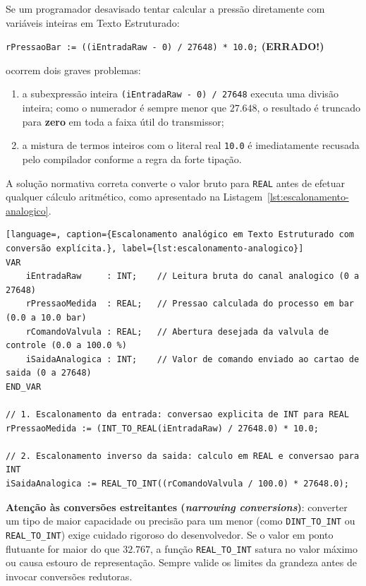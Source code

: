 Se um programador desavisado tentar calcular a pressão diretamente com variáveis inteiras em Texto
Estruturado:
\begin{center}
  \texttt{rPressaoBar := ((iEntradaRaw - 0) / 27648) * 10.0;} \quad \textbf{(ERRADO!)}
\end{center}
ocorrem dois graves problemas:
\begin{enumerate}
  \item a subexpressão inteira \texttt{(iEntradaRaw - 0) / 27648} executa uma divisão inteira;
        como o numerador é sempre menor que $27.648$, o resultado é truncado para \textbf{zero} em
        toda a faixa útil do transmissor;
  \item a mistura de termos inteiros com o literal real \texttt{10.0} é imediatamente recusada pelo
        compilador conforme a regra da forte tipação.
\end{enumerate}

A solução normativa correta converte o valor bruto para \texttt{REAL} antes de efetuar qualquer
cálculo aritmético, como apresentado na Listagem~\ref{lst:escalonamento-analogico}.

\begin{lstlisting}[language=, caption={Escalonamento analógico em Texto Estruturado com conversão explícita.}, label={lst:escalonamento-analogico}]
VAR
    iEntradaRaw     : INT;    // Leitura bruta do canal analogico (0 a 27648)
    rPressaoMedida  : REAL;   // Pressao calculada do processo em bar (0.0 a 10.0 bar)
    rComandoValvula : REAL;   // Abertura desejada da valvula de controle (0.0 a 100.0 %)
    iSaidaAnalogica : INT;    // Valor de comando enviado ao cartao de saida (0 a 27648)
END_VAR

// 1. Escalonamento da entrada: conversao explicita de INT para REAL
rPressaoMedida := (INT_TO_REAL(iEntradaRaw) / 27648.0) * 10.0;

// 2. Escalonamento inverso da saida: calculo em REAL e conversao para INT
iSaidaAnalogica := REAL_TO_INT((rComandoValvula / 100.0) * 27648.0);
\end{lstlisting}

\begin{atencao}
\textbf{Atenção às conversões estreitantes (\emph{narrowing conversions})}: converter um tipo de
maior capacidade ou precisão para um menor (como \texttt{DINT\_TO\_INT} ou \texttt{REAL\_TO\_INT})
exige cuidado rigoroso do desenvolvedor. Se o valor em ponto flutuante for maior do que $32.767$, a
função \texttt{REAL\_TO\_INT} satura no valor máximo ou causa estouro de representação. Sempre
valide os limites da grandeza antes de invocar conversões redutoras.
\end{atencao}

